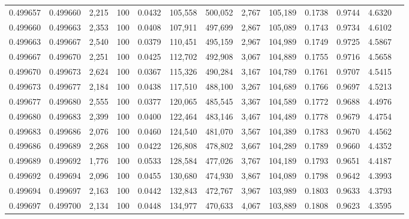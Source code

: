 \begin{tabular}{rrrrrrrrrrrrr}
0.499657 & 0.499660 & 2,215 & 100 &                                     0.0432 & 105,558 & 500,052 &   2,767 & 105,189 & 0.1738 & 0.9744 & 4.6320 \\
0.499660 & 0.499663 & 2,353 & 100 &                                     0.0408 & 107,911 & 497,699 &   2,867 & 105,089 & 0.1743 & 0.9734 & 4.6102 \\
0.499663 & 0.499667 & 2,540 & 100 &                                     0.0379 & 110,451 & 495,159 &   2,967 & 104,989 & 0.1749 & 0.9725 & 4.5867 \\
0.499667 & 0.499670 & 2,251 & 100 &                                     0.0425 & 112,702 & 492,908 &   3,067 & 104,889 & 0.1755 & 0.9716 & 4.5658 \\
0.499670 & 0.499673 & 2,624 & 100 &                                     0.0367 & 115,326 & 490,284 &   3,167 & 104,789 & 0.1761 & 0.9707 & 4.5415 \\
0.499673 & 0.499677 & 2,184 & 100 &                                     0.0438 & 117,510 & 488,100 &   3,267 & 104,689 & 0.1766 & 0.9697 & 4.5213 \\
0.499677 & 0.499680 & 2,555 & 100 &                                     0.0377 & 120,065 & 485,545 &   3,367 & 104,589 & 0.1772 & 0.9688 & 4.4976 \\
0.499680 & 0.499683 & 2,399 & 100 &                                     0.0400 & 122,464 & 483,146 &   3,467 & 104,489 & 0.1778 & 0.9679 & 4.4754 \\
0.499683 & 0.499686 & 2,076 & 100 &                                     0.0460 & 124,540 & 481,070 &   3,567 & 104,389 & 0.1783 & 0.9670 & 4.4562 \\
0.499686 & 0.499689 & 2,268 & 100 &                                     0.0422 & 126,808 & 478,802 &   3,667 & 104,289 & 0.1789 & 0.9660 & 4.4352 \\
0.499689 & 0.499692 & 1,776 & 100 &                                     0.0533 & 128,584 & 477,026 &   3,767 & 104,189 & 0.1793 & 0.9651 & 4.4187 \\
0.499692 & 0.499694 & 2,096 & 100 &                                     0.0455 & 130,680 & 474,930 &   3,867 & 104,089 & 0.1798 & 0.9642 & 4.3993 \\
0.499694 & 0.499697 & 2,163 & 100 &                                     0.0442 & 132,843 & 472,767 &   3,967 & 103,989 & 0.1803 & 0.9633 & 4.3793 \\
0.499697 & 0.499700 & 2,134 & 100 &                                     0.0448 & 134,977 & 470,633 &   4,067 & 103,889 & 0.1808 & 0.9623 & 4.3595 \\

\end{tabular}
